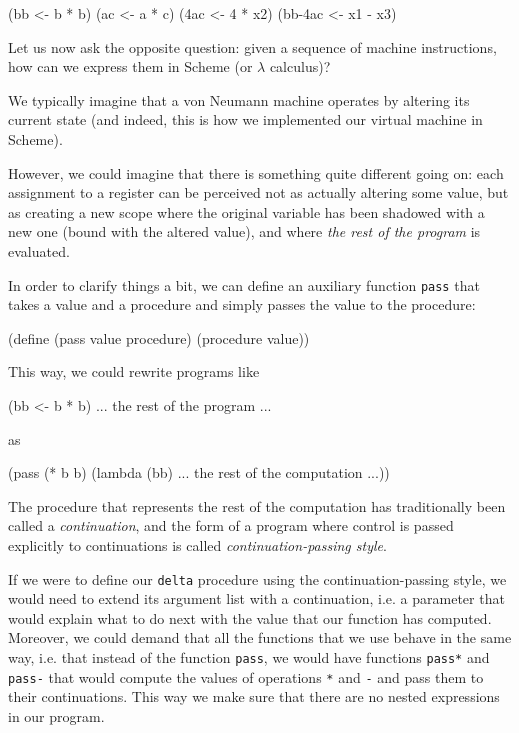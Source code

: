 \begin{Snippet}
  (bb <- b * b)
  (ac <- a * c)
  (4ac <- 4 * x2)
  (bb-4ac <- x1 - x3)
\end{Snippet}

Let us now ask the opposite question: given a sequence of machine
instructions, how can we express them in Scheme (or $\lambda$ calculus)?

We typically imagine that a von Neumann machine operates by altering
its current state (and indeed, this is how we implemented our virtual
machine in Scheme).

However, we could imagine that there is something quite different
going on: each assignment to a register can be perceived not as
actually altering some value, but as creating a new scope where
the original variable has been shadowed with a new one (bound with
the altered value), and where \textit{the rest of the program}
is evaluated.

In order to clarify things a bit, we can define an auxiliary
function \texttt{pass} that takes a value and a procedure and
simply passes the value to the procedure:
\begin{Snippet}
  (define (pass value procedure)
    (procedure value))
\end{Snippet}

This way, we could rewrite programs like

\begin{Snippet}
  (bb <- b * b)
  ... the rest of the program ...
\end{Snippet}

as

\begin{Snippet}
  (pass (* b b)
    (lambda (bb)
      ... the rest of the computation ...))
\end{Snippet}

The procedure that represents the rest of the computation has
traditionally been called a \textit{continuation}, and the form
of a program where control is passed explicitly to continuations
is called \textit{continuation-passing style}\cite{SussmanSteele1976}.

If we were to define our \texttt{delta} procedure using the
continuation-passing style, we would need to extend its
argument list with a continuation, i.e. a parameter that
would explain what to do next with the value that our function
has computed. Moreover, we could demand that all the functions
that we use behave in the same way, i.e. that instead of the
function \texttt{pass}, we would have functions \texttt{pass*}
and \texttt{pass-} that would compute the values of operations
\texttt{*} and \texttt{-} and pass them to their continuations.
This way we make sure that there are no nested expressions
in our program.

